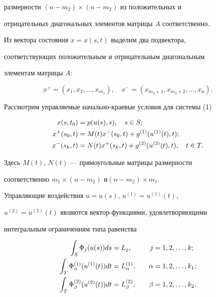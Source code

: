 размерности $(n-m_2)\times (n-m_2)$ из положительных и


отрицательных диагональных элементов матрицы $A$ соответственно.


Из вектора состояния $x=x(s,t)$ выделим два подвектора,


соответствующих положительным и отрицательным диагональным


элементам матрицы $A$:


$$


x^+ = (x_1,x_2,\dotsc,x_{m_1}), \quad x^- =


(x_{m_2+1},x_{m_2+2},\dotsc, x_n).


$$





Рассмотрим  управляемые начально-краевые условия для системы (1)


\begin{align}


x(s,t_0)&=p(u(s),s), \quad s\in S; \notag \\


x^+(s_0,t)&=M(t) x^-(s_0,t)+g^{(1)}(u^{(1)}(t),t);\\


x^-(s_k,t)&=N(t) x^+(s_k,t)+g^{(2)}(u^{(2)}(t),t),


\quad t\in T.\notag


\end{align}


Здесь $M(t)$, $N(t)$ --- прямоугольные матрицы размерности


соответственно $m_1\times (n-m_2)$ и\linebreak $(n-m_2)\times m_1$.


Управляющие воздействия  $u=u(s)$, $u^{(1)}=u^{(1)}(t)$,


$u^{(2)}=u^{(2)}(t)$ являются век\-тор-функциями, удовлетворяющими


интегральным ограничениям типа равенства


\begin{alignat}{2}


\int_S \Phi_j


(u(s)) ds &= L_j, &\quad j&=1,2,\dotsc,k; \notag \\


\int_T \Phi^{(1)}_\alpha


(u^{(1)}(t)) dt &= L^{(1)}_\alpha, &\quad \alpha&=1,2,\dotsc,k_1;\\


\int_T \Phi^{(2)}_\beta


(u^{(2)}(t)) dt &= L^{(2)}_\beta, &\quad \beta&=1,2,\dotsc,k_2.\notag


\end{alignat}


